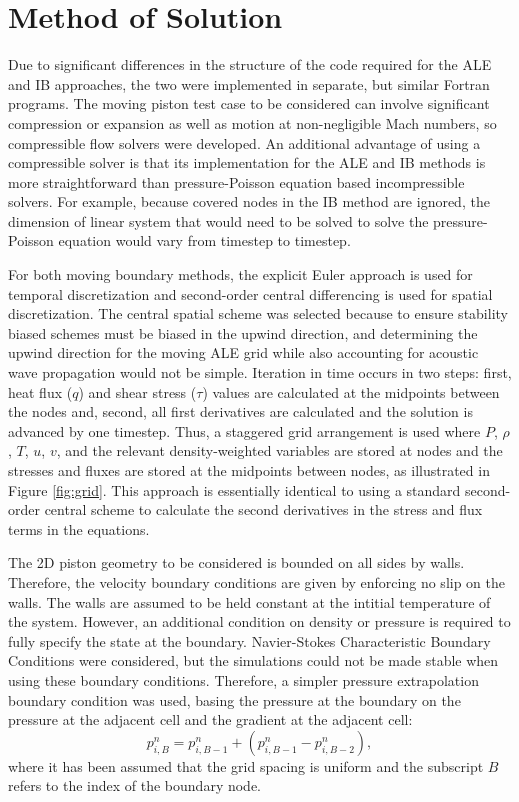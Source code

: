 \documentclass{article}
\begin{document}
\section{Method of Solution}
Due to significant differences in the structure of the code required for the ALE and IB approaches, the two were implemented in separate, but similar Fortran programs. The moving piston test case to be considered can involve significant compression or expansion as well as motion at non-negligible Mach numbers, so compressible flow solvers were developed. An additional advantage of using a compressible solver is that its implementation for the ALE and IB methods is more straightforward than pressure-Poisson equation based incompressible solvers. For example, because covered nodes in the IB method are ignored, the dimension of linear system that would need to be solved to solve the pressure-Poisson equation would vary from timestep to timestep. 

For both moving boundary methods, the explicit Euler approach is used for temporal discretization and second-order central differencing is used for spatial discretization. The central spatial scheme was selected because to ensure stability biased schemes must be biased in the upwind direction, and determining the upwind direction for the moving ALE grid while also accounting for acoustic wave propagation would not be simple. Iteration in time occurs in two steps: first, heat flux ($q$) and shear stress ($\tau$) values are calculated at the midpoints between the nodes and, second, all first derivatives are calculated and the solution is advanced by one timestep. Thus, a staggered grid arrangement is used where $P$, $\rho$, $T$, $u$, $v$, and the relevant density-weighted variables are stored at nodes and the stresses and fluxes are stored at the midpoints between nodes, as illustrated in Figure \ref{fig:grid}. This approach is essentially identical to using a standard second-order central scheme to calculate the second derivatives in the stress and flux terms in the equations. 

The 2D piston geometry to be considered is bounded on all sides by walls. Therefore, the velocity boundary conditions are given by enforcing no slip on the walls. The walls are assumed to be held constant at the intitial temperature of the system. However, an additional condition on density or pressure is required to fully specify the state at the boundary. Navier-Stokes Characteristic Boundary Conditions \cite{} were considered, but the simulations could not be made stable when using these boundary conditions. Therefore, a simpler pressure extrapolation boundary condition was used, basing the pressure at the boundary on the pressure at the adjacent cell and the gradient at the adjacent cell:
\begin{equation}
p^n_{i,B} = p^n_{i,B-1} + (p^n_{i,B-1} - p^n_{i,B-2}),
\end{equation}
where it has been assumed that the grid spacing is uniform and the subscript $B$ refers to the index of the boundary node.
\end{document}
